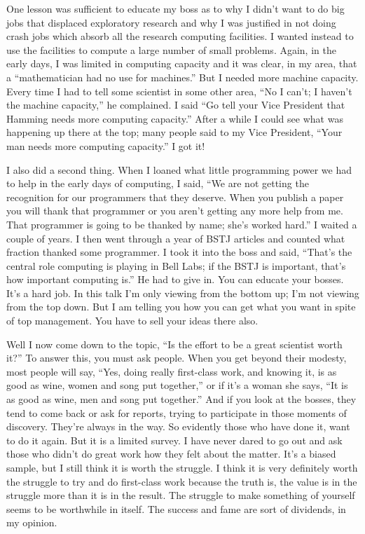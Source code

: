 \documentclass{article}
\begin{document}
One lesson was sufficient to educate my boss as to why I didn't want to do big jobs that displaced exploratory research and why I was justified in not doing crash jobs which absorb all the research computing facilities. I wanted instead to use the facilities to compute a large number of small problems. Again, in the early days, I was limited in computing capacity and it was clear, in my area, that a ``mathematician had no use for machines.'' But I needed more machine capacity. Every time I had to tell some scientist in some other area, ``No I can't; I haven't the machine capacity,'' he complained. I said ``Go tell your Vice President that Hamming needs more computing capacity.'' After a while I could see what was happening up there at the top; many people said to my Vice President, ``Your man needs more computing capacity.'' I got it!

I also did a second thing. When I loaned what little programming power we had to help in the early days of computing, I said, ``We are not getting the recognition for our programmers that they deserve. When you publish a paper you will thank that programmer or you aren't getting any more help from me. That programmer is going to be thanked by name; she's worked hard.'' I waited a couple of years. I then went through a year of BSTJ articles and counted what fraction thanked some programmer. I took it into the boss and said, ``That's the central role computing is playing in Bell Labs; if the BSTJ is important, that's how important computing is.'' He had to give in. You can educate your bosses. It's a hard job. In this talk I'm only viewing from the bottom up; I'm not viewing from the top down. But I am telling you how you can get what you want in spite of top management. You have to sell your ideas there also.

Well I now come down to the topic, ``Is the effort to be a great scientist worth it?'' To answer this, you must ask people. When you get beyond their modesty, most people will say, ``Yes, doing really first-class work, and knowing it, is as good as wine, women and song put together,'' or if it's a woman she says, ``It is as good as wine, men and song put together.'' And if you look at the bosses, they tend to come back or ask for reports, trying to participate in those moments of discovery. They're always in the way. So evidently those who have done it, want to do it again. But it is a limited survey. I have never dared to go out and ask those who didn't do great work how they felt about the matter. It's a biased sample, but I still think it is worth the struggle. I think it is very definitely worth the struggle to try and do first-class work because the truth is, the value is in the struggle more than it is in the result. The struggle to make something of yourself seems to be worthwhile in itself. The success and fame are sort of dividends, in my opinion.
\end{document}
